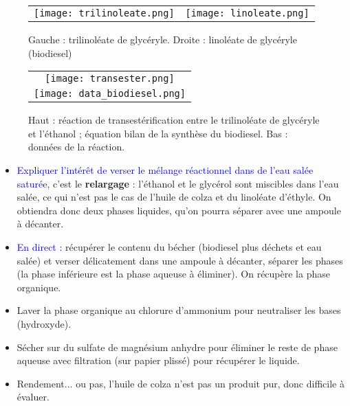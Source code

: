 \documentclass[11pt,a4paper]{report}
\begin{document}
	\begin{figure}[h!]
		\begin{center}
			\begin{tabular}{cc}	
			\texttt{[image: trilinoleate.png]}& 
			\texttt{[image: linoleate.png]}\\
		\end{tabular}
		\end{center}
		\caption{Gauche : trilinoléate de glycéryle. Droite : linoléate de glycéryle (biodiesel)}
	\end{figure}

	\begin{figure}[h!]
		\begin{center}
		\begin{tabular}{c}
			\texttt{[image: transester.png]}\\
			\texttt{[image: data\_biodiesel.png]}
		\end{tabular}
		\end{center}	
		\caption{Haut : réaction de transestérification entre le trilinoléate de glycéryle 
		et l'éthanol ; équation bilan de la synthèse du biodiesel. Bas : données de la réaction.}
	\end{figure}
	
	\begin{itemize}
		\item \textcolor{blue}{Expliquer l'intérêt de verser le mélange réactionnel dans de l'eau salée 		saturée}, c'est le \textbf{relargage} : l'éthanol et le glycérol sont miscibles dans l'eau 				salée, ce qui n'est pas le cas de l'huile de colza et du linoléate d'éthyle. On obtiendra donc 			deux phases liquides, qu'on pourra séparer avec une ampoule à décanter.
	\end{itemize}
	\begin{itemize}
		\item \textcolor{blue}{En direct :} récupérer le contenu du bécher (biodiesel plus déchets et			eau salée) et verser délicatement dans une ampoule à décanter, séparer les phases (la phase 			inférieure est la phase aqueuse à éliminer). On récupère la phase organique.
		\item Laver la phase organique au chlorure d'ammonium pour neutraliser les bases (hydroxyde).
		\item Sécher sur du sulfate de magnésium anhydre pour éliminer le reste de phase aqueuse avec 			filtration (sur papier plissé) pour récupérer le liquide.
		\item Rendement... ou pas, l'huile de colza n'est pas un produit pur, 
		donc difficile à évaluer.\\
	\end{itemize}
\end{document}
